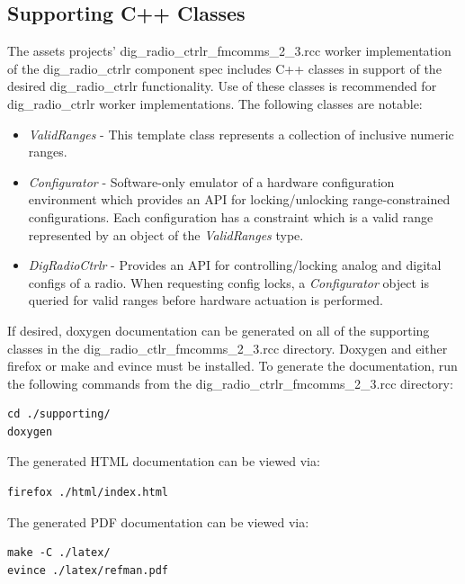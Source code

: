 \documentclass{article}
\def\comp{dig\_radio\_ctrlr}
\begin{document}
  \subsection{Supporting C++ Classes}
    The assets projects' dig\_radio\_ctrlr\_fmcomms\_2\_3.rcc worker
    implementation\cite{dig_radio_ctrlr_fmcomms_2_3_comp_datasheet} of the
    \comp{}
    component spec includes C++ classes in support of the desired
    \comp{} functionality.
    Use of these classes is recommended for \comp{} worker
    implementations. The following classes are notable:
    \begin{itemize}
      \item \textit{ValidRanges} - This template class represents a collection of inclusive numeric ranges. 
      \item \textit{Configurator} - Software-only emulator of a hardware configuration environment which provides an API for locking/unlocking range-constrained configurations. Each configuration has a constraint which is a valid range represented by an object of the \textit{ValidRanges} type.
      \item \textit{DigRadioCtrlr} -
        Provides an API for controlling/locking analog and digital configs of
        a radio. When requesting config locks, a \textit{Configurator} object is
        queried for valid ranges before hardware actuation is performed.
    \end{itemize}
    If desired, doxygen documentation can be generated on all
    of the supporting classes in the dig\_radio\_ctlr\_fmcomms\_2\_3.rcc
    directory. Doxygen and
    either firefox or make and evince
    must be installed. To generate
    the documentation, run the following commands from the
    dig\_radio\_ctrlr\_fmcomms\_2\_3.rcc directory:
    \begin{lstlisting}
cd ./supporting/
doxygen
    \end{lstlisting}
The generated HTML documentation can be viewed via:
    \begin{lstlisting}
firefox ./html/index.html
    \end{lstlisting}
The generated PDF documentation can be viewed via:
    \begin{lstlisting}
make -C ./latex/
evince ./latex/refman.pdf
    \end{lstlisting}
\end{document}
